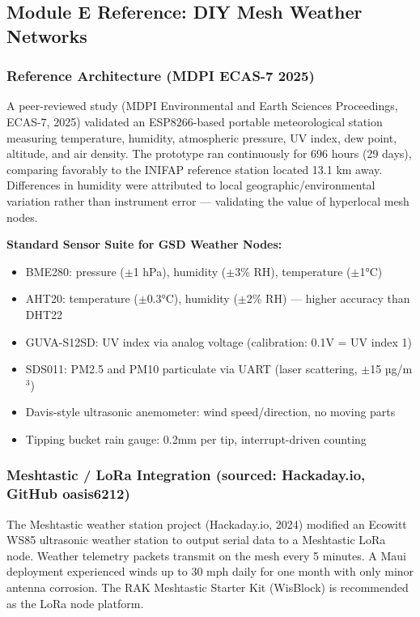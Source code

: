 \documentclass[11pt,letterpaper]{article}
\begin{document}
\subsection{Module E Reference: DIY Mesh Weather Networks}

\subsubsection{Reference Architecture (MDPI ECAS-7 2025)}

A peer-reviewed study (MDPI Environmental and Earth Sciences Proceedings, ECAS-7, 2025) validated an ESP8266-based portable meteorological station measuring temperature, humidity, atmospheric pressure, UV index, dew point, altitude, and air density. The prototype ran continuously for 696 hours (29 days), comparing favorably to the INIFAP reference station located 13.1 km away. Differences in humidity were attributed to local geographic/environmental variation rather than instrument error --- validating the value of hyperlocal mesh nodes.

\textbf{Standard Sensor Suite for GSD Weather Nodes:}
\begin{itemize}[leftmargin=1.5em]
  \item BME280: pressure ($\pm$1 hPa), humidity ($\pm$3\% RH), temperature ($\pm$1°C)
  \item AHT20: temperature ($\pm$0.3°C), humidity ($\pm$2\% RH) --- higher accuracy than DHT22
  \item GUVA-S12SD: UV index via analog voltage (calibration: 0.1V = UV index 1)
  \item SDS011: PM2.5 and PM10 particulate via UART (laser scattering, $\pm$15 µg/m$^3$)
  \item Davis-style ultrasonic anemometer: wind speed/direction, no moving parts
  \item Tipping bucket rain gauge: 0.2mm per tip, interrupt-driven counting
\end{itemize}

\subsubsection{Meshtastic / LoRa Integration (sourced: Hackaday.io, GitHub oasis6212)}

The Meshtastic weather station project (Hackaday.io, 2024) modified an Ecowitt WS85 ultrasonic weather station to output serial data to a Meshtastic LoRa node. Weather telemetry packets transmit on the mesh every 5 minutes. A Maui deployment experienced winds up to 30 mph daily for one month with only minor antenna corrosion. The RAK Meshtastic Starter Kit (WisBlock) is recommended as the LoRa node platform.
\end{document}
